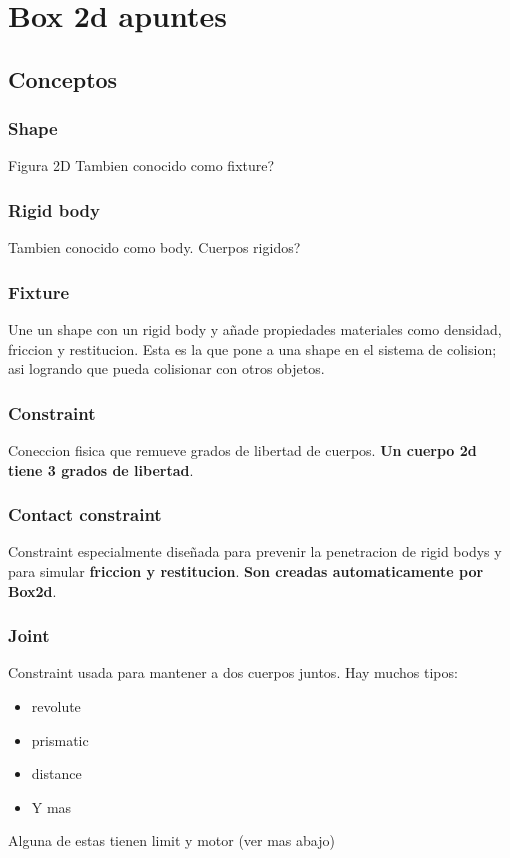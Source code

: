 \documentclass[11pt]{article}
\date{\today}
\title{}
\begin{document}
\tableofcontents

\section{Box 2d apuntes}
\label{sec:org6d6bf87}

\subsection{Conceptos}
\label{sec:orgfb0259f}
\subsubsection{Shape}
\label{sec:org35f2d67}
Figura 2D
Tambien conocido como fixture?
\subsubsection{Rigid body}
\label{sec:org72b1f51}
Tambien conocido como body.
Cuerpos rigidos?
\subsubsection{Fixture}
\label{sec:orge0087d0}
Une un shape con un rigid body y añade propiedades materiales como densidad, friccion y restitucion.
Esta es la que pone a una shape en el sistema de colision; asi logrando que pueda colisionar con otros objetos.
\subsubsection{Constraint}
\label{sec:org23056b8}
Coneccion fisica que remueve grados de libertad de cuerpos.
\textbf{Un cuerpo 2d tiene 3 grados de libertad}. 
\subsubsection{Contact constraint}
\label{sec:org3f4a89d}
Constraint especialmente diseñada para prevenir la penetracion de rigid bodys y para simular \textbf{friccion y restitucion}.
\textbf{Son creadas automaticamente por Box2d}.
\subsubsection{Joint}
\label{sec:orgbeff2c5}
Constraint usada para mantener a dos cuerpos juntos.
Hay muchos tipos:
\begin{itemize}
\item revolute
\item prismatic
\item distance
\item Y mas
\end{itemize}
Alguna de estas tienen limit y motor (ver mas abajo)
\end{document}

